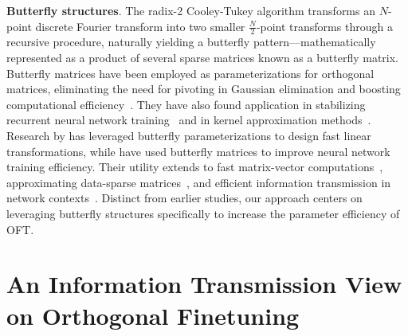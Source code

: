 \textbf{Butterfly structures}. The radix-2 Cooley-Tukey algorithm transforms an $N$-point discrete Fourier transform into two smaller $\frac{N}{2}$-point transforms through a recursive procedure, naturally yielding a butterfly pattern—mathematically represented as a product of several sparse matrices known as a butterfly matrix. Butterfly matrices have been employed as parameterizations for orthogonal matrices, eliminating the need for pivoting in Gaussian elimination and boosting computational efficiency~\cite{parker1995random}. They have also found application in stabilizing recurrent neural network training~\cite{jing2017tunable} and in kernel approximation methods~\cite{munkhoeva2018quadrature}. Research by \cite{dao2019learning,dao2019kaleidoscope} has leveraged butterfly parameterizations to design fast linear transformations, while \cite{chen2022pixelated,dao2022monarch} have used butterfly matrices to improve neural network training efficiency. Their utility extends to fast matrix-vector computations~\cite{michielssen1996multilevel,o2010algorithm}, approximating data-sparse matrices~\cite{li2015butterfly}, and efficient information transmission in network contexts~\cite{klasing1994broadcasting,li2003linear,rajasingh2016transmission}. Distinct from earlier studies, our approach centers on leveraging butterfly structures specifically to increase the parameter efficiency of OFT.

\section{An Information Transmission View on Orthogonal Finetuning}

